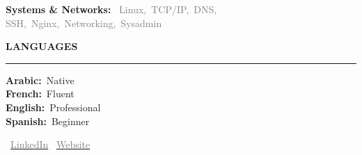 \documentclass[10pt,a4paper]{article}
\newcommand{\cvsection}[1]{%
  \vspace{6pt}%
  {\large\bfseries\color{heading}\MakeUppercase{#1}}\\[-3pt]%
  {\color{rulecolor}\rule{\linewidth}{1.2pt}}%
  \vspace{3pt}\par}
\newcommand{\skillcat}[2]{%
  {\small\textbf{\textcolor{heading}{#1:}}\ %
  {\footnotesize\textcolor{graytext}{#2}}}\par\vspace{2pt}}
\begin{document}
\begin{minipage}[t]{0.39\linewidth}
\skillcat{Systems \& Networks}{Linux,\ TCP/IP,\ DNS,\\
  SSH,\ Nginx,\ Networking,\ Sysadmin}

\cvsection{Languages}

{\small
\textbf{Arabic:}\ Native\\[2pt]
\textbf{French:}\ Fluent\\[2pt]
\textbf{English:}\ Professional\\[2pt]
\textbf{Spanish:}\ Beginner\\[2pt]
}

\vfill

\begin{center}
  \vspace{4pt}
  {\small\textcolor{accent}{\faLinkedin}\ \href{https://linkedin.com/in/yassin-najmi-ynj05}{\textcolor{graytext}{LinkedIn}}}%
  \qquad
  {\small\textcolor{accent}{\faGlobe}\ \href{https://portfolio-ynj.vercel.app}{\textcolor{graytext}{Website}}}
\end{center}

\end{minipage}
\end{document}
